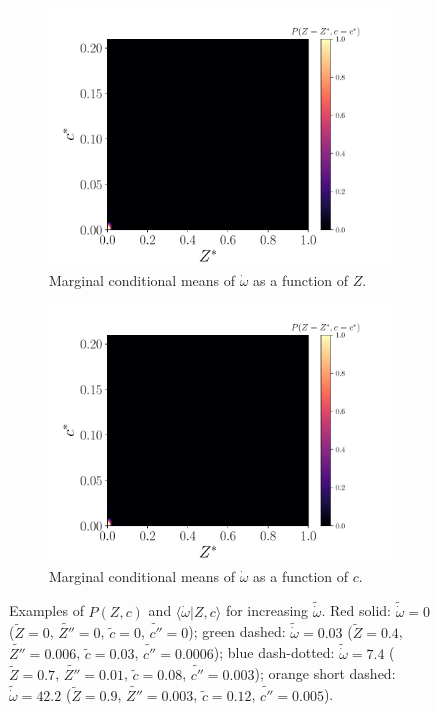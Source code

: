 \documentclass[review]{elsarticle}
\newcommand{\wt}[1]{\widetilde{#1}}
\begin{document}
\begin{figure}[!tbp]
\begin{subfigure}[t]{0.48\textwidth}
    \includegraphics[page=11,width=\textwidth]{./figs/pdfs_dice_0004.pdf}%
    \caption{Marginal conditional means of $\dot{\omega}$ as a function of $Z$.}%
  \end{subfigure}\hfill%
  \begin{subfigure}[t]{0.48\textwidth}%
    \includegraphics[page=12,width=\textwidth]{./figs/pdfs_dice_0004.pdf}%
    \caption{Marginal conditional means of $\dot{\omega}$ as a function of $c$.}%
  \end{subfigure}%
  \caption{Examples of $P(Z,c)$ and $\langle \dot{\omega} | Z, c \rangle$ for increasing $\wt{\dot{\omega}}$. Red solid: $\wt{\dot{\omega}} = 0$ ($\wt{Z} = 0$, $\wt{Z''} = 0$, $\wt{c} = 0$, $\wt{c''} = 0$); green dashed: $\wt{\dot{\omega}} = 0.03$ ($\wt{Z}  =0.4$, $\wt{Z''}=0.006$, $\wt{c}  =0.03$, $\wt{c''}=0.0006$); blue dash-dotted: $\wt{\dot{\omega}} = 7.4$ ($\wt{Z}  =0.7$, $\wt{Z''}=0.01$, $\wt{c}  =0.08$, $\wt{c''}=0.003$); orange short dashed: $\wt{\dot{\omega}} = 42.2$ ($\wt{Z}  =0.9$, $\wt{Z''}=0.003$, $\wt{c}  =0.12$, $\wt{c''}=0.005$).}\label{fig:pdfs}%
\end{figure}%
\end{document}
